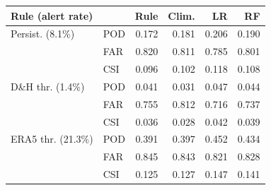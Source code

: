 \begin{tabular}{llrrrr}
\toprule
Rule (alert rate) & & Rule & Clim. & LR & RF \\
\midrule
Persist. (8.1\%) & POD & 0.172 & 0.181 & 0.206 & 0.190 \\
 & FAR & 0.820 & 0.811 & 0.785 & 0.801 \\
 & CSI & 0.096 & 0.102 & 0.118 & 0.108 \\
\addlinespace[2pt]
D\&H thr. (1.4\%) & POD & 0.041 & 0.031 & 0.047 & 0.044 \\
 & FAR & 0.755 & 0.812 & 0.716 & 0.737 \\
 & CSI & 0.036 & 0.028 & 0.042 & 0.039 \\
\addlinespace[2pt]
ERA5 thr. (21.3\%) & POD & 0.391 & 0.397 & 0.452 & 0.434 \\
 & FAR & 0.845 & 0.843 & 0.821 & 0.828 \\
 & CSI & 0.125 & 0.127 & 0.147 & 0.141 \\
\bottomrule
\end{tabular}
